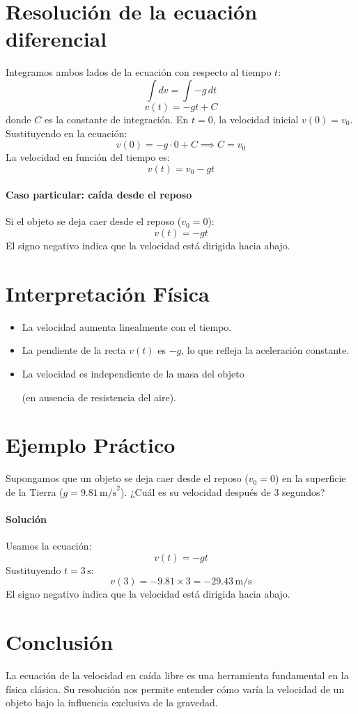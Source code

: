 \documentclass[12pt,a4paper]{article}
\begin{document}
\section{Resolución de la ecuación diferencial}
Integramos ambos lados de la ecuación con respecto al tiempo \( t \):
\[
\int dv = \int -g \, dt
\]
\[
v(t) = -g t + C
\]
donde \( C \) es la constante de integración.
%
En \( t = 0 \), la velocidad inicial \( v(0) = v_0 \). Sustituyendo en la ecuación:
\[
v(0) = -g \cdot 0 + C \implies C = v_0
\]
%
La velocidad en función del tiempo es:
\[
v(t) = v_0 - g t
\]

\paragraph{Caso particular: caída desde el reposo}
Si el objeto se deja caer desde el reposo (\( v_0 = 0 \)):
\[
v(t) = -g t
\]
El signo negativo indica que la velocidad está dirigida hacia abajo.

\section{Interpretación Física}
\begin{itemize}
    \item La velocidad aumenta linealmente con el tiempo.
    \item La pendiente de la recta \( v(t) \) es \( -g \), lo que refleja la aceleración constante.
    \item La velocidad es independiente de la masa del objeto 
    
    (en ausencia de resistencia del aire).
\end{itemize}

\section{Ejemplo Práctico}
Supongamos que un objeto se deja caer desde el reposo (\( v_0 = 0 \)) en la superficie de la Tierra (\( g = 9.81 \, \text{m/s}^2 \)). ¿Cuál es su velocidad después de \( 3 \) segundos?

\paragraph{Solución}
Usamos la ecuación:
\[
v(t) = -g t
\]
Sustituyendo \( t = 3 \, \text{s} \):
\[
v(3) = -9.81 \times 3 = -29.43 \, \text{m/s}
\]
El signo negativo indica que la velocidad está dirigida hacia abajo.

\section{Conclusión}
La ecuación de la velocidad en caída libre es una herramienta fundamental en la física clásica. Su resolución nos permite entender cómo varía la velocidad de un objeto bajo la influencia exclusiva de la gravedad.
\end{document}
